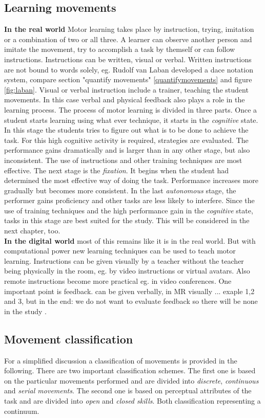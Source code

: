 \subsection{Learning movements}
\textbf{In the real world} Motor learning takes place by instruction, trying, imitation or a combination of two or all three. A learner can observe another person and imitate the movement, try to accomplish a task by themself or can follow instructions. Instructions can be written, visual or verbal. Written instructions are not bound to words solely, eg. Rudolf van Laban developed a dace notation system, compare section "quantify movements" \ref{quantifymovements} and figure \ref{fig:laban}. Visual or verbal instruction include a trainer, teaching the student movements. In this case verbal and physical feedback also plays a role in the learning process. The process of motor learning is divided in three parts. Once a student starts learning using what ever technique, it starts in the \textit{cognitive} state. In this stage the students tries to figure out what is to be done to achieve the task. For this high cognitive activity is required, strategies are evaluated. The performance gains dramatically and is larger than in any other stage, but also inconsistent. The use of instructions and other training techniques are most effective. The next stage is the \textit{fixation}. It begins when the student had determined the most effective way of doing the task. Performance increases more gradually but becomes more consistent. In the last \textit{autonomous} stage, the performer gains proficiency and other tasks are less likely to interfere. Since the use of training techniques and the high performance gain in the \textit{cognitive} state, tasks in this stage are best suited for the study. This will be considered in the next chapter, too.\\
\textbf{In the digital world} most of this remains like it is in the real world. But with computational power new learning techniques can be used to teach motor learning. Instructions can be given visually by a teacher without the teacher being physically in the room, eg. by video instructions or virtual avatars. Also remote instructions become more practical eg. in video conferences. One important point is feedback. \todo can be given verbally, in MR visually ... exaple 1,2 and 3, but in the end: we do not want to evaluate feedback so there will be none in the study \markAonefiveFeedback.

\subsection{Movement classification}
For a simplified discussion a classification of movements is provided in the following. There are two important classification schemes. The first one is based on the particular movements performed and are divided into \textit{discrete}, \textit{continuous} and \textit{serial movements}. The second one is based on perceptual attributes of the task and are divided into \textit{open} and \textit{closed skills}. Both classification representing a continuum.

